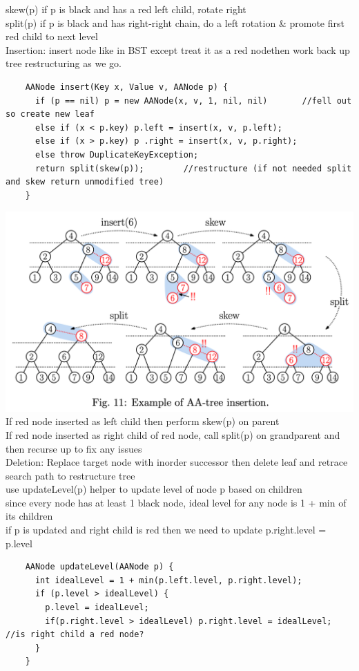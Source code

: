 \documentclass{article}
\begin{document}
  \indent \indent skew(p) if p is black and has a red left child, rotate right \\
  \indent split(p) if p is black and has right-right chain, do a left rotation \& promote first red child to next level \\
  Insertion: insert node like in BST except treat it as a red nodethen work back up tree restructuring as we go. 
  \begin{lstlisting}
    AANode insert(Key x, Value v, AANode p) {
      if (p == nil) p = new AANode(x, v, 1, nil, nil)       //fell out so create new leaf
      else if (x < p.key) p.left = insert(x, v, p.left);
      else if (x > p.key) p .right = insert(x, v, p.right);
      else throw DuplicateKeyException;
      return split(skew(p));        //restructure (if not needed split and skew return unmodified tree)
    }
  \end{lstlisting}
  \includegraphics[width=\textwidth]{InsertionAATree}
  \indent If red node inserted as left child then perform skew(p) on parent\\
  \indent If red node inserted as right child of red node, call split(p) on grandparent and then recurse up to fix any issues \\
  Deletion: Replace target node with inorder successor then delete leaf and retrace search path to restructure tree \\
  \indent use updateLevel(p) helper to update level of node p based on children \\
  \indent \indent since every node has at least 1 black node, ideal level for any node is 1 + min of its children \\
  \indent \indent if p is updated and right child is red then we need to update p.right.level = p.level\\ 
  \begin{lstlisting}
    AANode updateLevel(AANode p) {
      int idealLevel = 1 + min(p.left.level, p.right.level);
      if (p.level > idealLevel) {
        p.level = idealLevel;
        if(p.right.level > idealLevel) p.right.level = idealLevel;  //is right child a red node?
      }
    } 
  \end{lstlisting}
\end{document}
